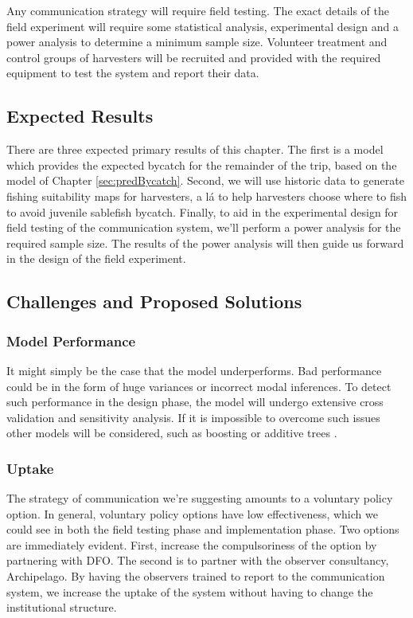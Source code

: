 \documentclass{article}
\begin{document}
Any communication strategy will require field testing. The exact details of the field experiment will require some statistical analysis, experimental design and a power analysis to determine a minimum sample size. Volunteer treatment and control groups of harvesters will be recruited and provided with the required equipment to test the system and report their data.


\subsection{Expected Results}

There are three expected primary results of this chapter. The first is a model which provides the expected bycatch for the remainder of the trip, based on the model of Chapter \ref{sec:predBycatch}. Second, we will use historic data to generate fishing suitability maps for harvesters, a l\'{a} \citet{vilela2015fishing} to help harvesters choose where to fish to avoid juvenile sablefish bycatch. Finally, to aid in the experimental design for field testing of the communication system, we'll perform a power analysis for the required sample size. The results of the power analysis will then guide us forward in the design of the field experiment.

\subsection{Challenges and Proposed Solutions}

\subsubsection*{Model Performance}

It might simply be the case that the model underperforms. Bad performance could be in the form of huge variances or incorrect modal inferences. To detect such performance in the design phase, the model will undergo extensive cross validation and sensitivity analysis. If it is impossible to overcome such issues other models will be considered, such as boosting or additive trees \citep{hastie2009elements}.

\subsubsection*{Uptake}

The strategy of communication we're suggesting amounts to a voluntary policy option. In general, voluntary policy options have low effectiveness, which we could see in both the field testing phase and implementation phase. Two options are immediately evident. First, increase the compulsoriness of the option by partnering with DFO. The second is to partner with the observer consultancy, Archipelago. By having the observers trained to report to the communication system, we increase the uptake of the system without having to change the institutional structure.
\end{document}
